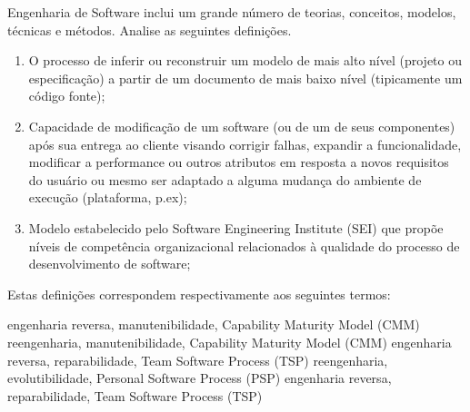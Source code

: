 \documentclass[12pt, addpoints]{exam}
\begin{document}
\begin{questions}
\question
Engenharia de Software inclui um grande número de teorias, conceitos, modelos, técnicas e métodos. Analise as seguintes definições.
\begin{enumerate}[label=\Roman*.]
    \item O processo de inferir ou reconstruir um modelo de mais alto nível (projeto ou especificação) a partir de um documento de mais baixo nível (tipicamente um código fonte);
    \item Capacidade de modificação de um software (ou de um de seus componentes) após sua entrega ao cliente visando corrigir falhas, expandir a funcionalidade, modificar a performance ou outros atributos em resposta a novos requisitos do usuário ou mesmo ser adaptado a alguma mudança do ambiente de execução (plataforma, p.ex);
    \item Modelo estabelecido pelo Software Engineering Institute (SEI) que propõe níveis de competência organizacional relacionados à qualidade do processo de desenvolvimento de software;
\end{enumerate}
Estas definições correspondem respectivamente aos seguintes termos:
\begin{choices}
\choice engenharia reversa, manutenibilidade, Capability Maturity Model (CMM)
\choice reengenharia, manutenibilidade, Capability Maturity Model (CMM)
\choice engenharia reversa, reparabilidade, Team Software Process (TSP)
\choice reengenharia, evolutibilidade, Personal Software Process (PSP)
\choice engenharia reversa, reparabilidade, Team Software Process (TSP)
\end{choices}


\end{questions}
\end{document}
